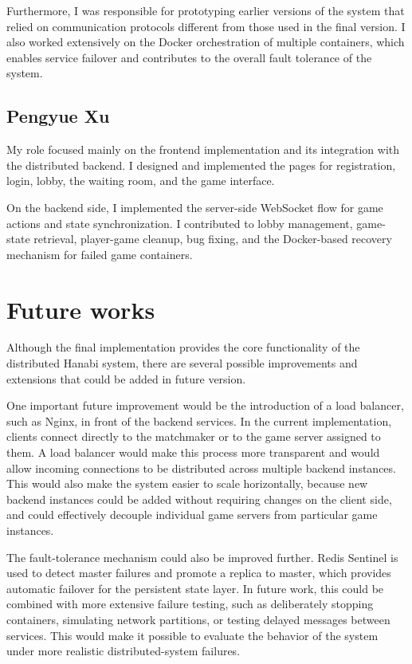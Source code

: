 \documentclass{scrartcl}
\begin{document}
Furthermore, I was responsible for prototyping earlier versions of the system that relied on communication protocols different from those used in the final version. I also worked extensively on the Docker orchestration of multiple containers, which enables service failover and contributes to the overall fault tolerance of the system.

\subsection{Pengyue Xu}
My role focused mainly on the frontend implementation and its integration with the distributed backend. I designed and implemented the pages for registration, login, lobby, the waiting room, and the game interface.

On the backend side, I implemented the server-side WebSocket flow for game actions and state synchronization. I contributed to lobby management, game-state retrieval, player-game cleanup, bug fixing, and the Docker-based recovery mechanism for failed game containers.

\section{Future works}\label{future-works}

Although the final implementation provides the core functionality of the distributed Hanabi system, there are several possible improvements and extensions that could be added in future version.

One important future improvement would be the introduction of a load balancer, such as Nginx, in front of the backend services. In the current implementation, clients connect directly to the matchmaker or to the game server assigned to them. A load balancer would make this process more transparent and would allow incoming connections to be distributed across multiple backend instances. This would also make the system easier to scale horizontally, because new backend instances could be added without requiring changes on the client side, and could effectively decouple individual game servers from particular game instances.

The fault-tolerance mechanism could also be improved further. Redis Sentinel is used to detect master failures and promote a replica to master, which provides automatic failover for the persistent state layer. In future work, this could be combined with more extensive failure testing, such as deliberately stopping containers, simulating network partitions, or testing delayed messages between services. This would make it possible to evaluate the behavior of the system under more realistic distributed-system failures.
\end{document}
